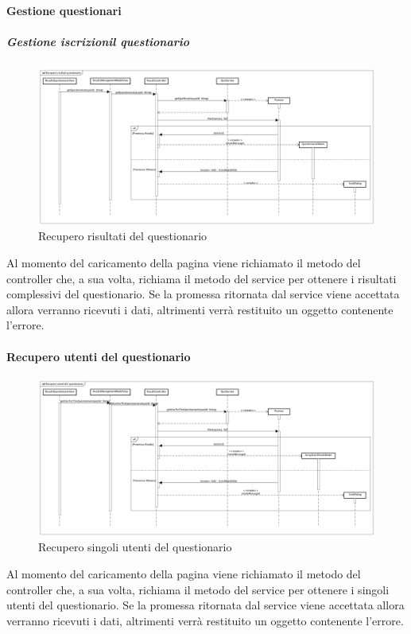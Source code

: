 \paragraph{Gestione questionari}

\subparagraph{Gestione iscrizionil questionario}
\label{Recupero risultati del questionario}
\begin{figure}[ht]
	\centering
	\includegraphics[scale=0.25,keepaspectratio]{UML/DiagrammiDiSequenza/Front-end/ResultsManagement.png}
	\caption{Recupero risultati del questionario}
\end{figure} \FloatBarrier
 
Al momento del caricamento della pagina viene richiamato il metodo del controller che, a sua volta, richiama il metodo del service per ottenere i risultati complessivi del questionario. Se la promessa ritornata dal service viene accettata allora verranno ricevuti i dati, altrimenti verrà restituito un oggetto contenente l'errore.


\paragraph{Recupero utenti del questionario}
\label{Recupero utenti del questionario}
\begin{figure}[ht]
	\centering
	\includegraphics[scale=0.25,keepaspectratio]{UML/DiagrammiDiSequenza/Front-end/GetUsersForQuestionnaire.png}
	\caption{Recupero singoli utenti del questionario}
\end{figure} \FloatBarrier

Al momento del caricamento della pagina viene richiamato il metodo del controller che, a sua volta, richiama il metodo del service per ottenere i singoli utenti del questionario. Se la promessa ritornata dal service viene accettata allora verranno ricevuti i dati, altrimenti verrà restituito un oggetto contenente l'errore.

